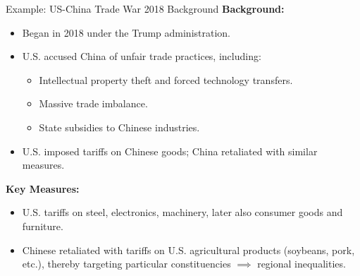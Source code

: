 \documentclass{beamer}
\begin{document}
\begin{frame}{Example: US-China Trade War 2018 Background}
    \textbf{Background:}
\begin{itemize} \small
    \item Began in 2018 under the Trump administration.
    \item U.S. accused China of unfair trade practices, including:
    \begin{itemize} \footnotesize
        \item Intellectual property theft and forced technology transfers.
        \item Massive trade imbalance. 
        \item State subsidies to Chinese industries.
    \end{itemize}
    \item U.S. imposed tariffs on Chinese goods; China retaliated with similar measures.
\end{itemize}
\textbf{Key Measures:}
\begin{itemize} \small
    \item U.S. tariffs on steel, electronics, machinery, later also consumer goods and furniture.
    \item Chinese retaliated with tariffs on U.S. agricultural products (soybeans, pork, etc.), thereby targeting particular constituencies $\implies$ regional inequalities.
\end{itemize}
\end{frame}
\end{document}
